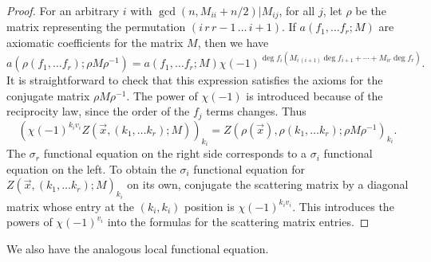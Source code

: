 \documentclass[11pt,letterpaper]{article}
\theoremstyle{definition}
\theoremstyle{remark}
\numberwithin{equation}{section}
\theoremstyle{dotless}
\begin{document}
\begin{proof}
For an arbitrary $i$ with $\gcd(n, M_{ii}+n/2) | M_{ij}$, for all $j$, let $\rho$ be the matrix representing the permutation $(i \, r \, r-1 \, \ldots \, i+1)$. If $a(f_1, \ldots f_r; M)$ are axiomatic coefficients for the matrix $M$, then we have
\begin{equation*} 
a(\rho(f_1, \ldots f_r); \rho M \rho^{-1}) = a(f_1, \ldots f_r; M) \chi(-1)^{\deg f_i (M_{i \, (i+1)} \deg f_{i+1} + \cdots + M_{ir}\deg f_r)}.
\end{equation*}
It is straightforward to check that this expression satisfies the axioms for the conjugate matrix $\rho M \rho^{-1}$. The power of $\chi(-1)$ is introduced because of the reciprocity law, since the order of the $f_j$ terms changes. Thus 
\begin{equation*}
(\chi(-1)^{k_i v_i} Z(\vec{x}, (k_1, \ldots k_r); M))_{k_i} = Z(\rho(\vec{x}), \rho(k_1, \ldots k_r); \rho M \rho^{-1})_{k_i}.
\end{equation*}
The $\sigma_r$ functional equation on the right side corresponds to a $\sigma_i$ functional equation on the left. To obtain the $\sigma_i$ functional equation for $Z(\vec{x}, (k_1, \ldots k_r); M)_{k_i}$ on its own, conjugate the scattering matrix by a diagonal matrix whose entry at the $(k_i, k_i)$ position is $\chi(-1)^{k_i v_i}$. This introduces the powers of $\chi(-1)^{v_i}$ into the formulas for the scattering matrix entries.
\end{proof}


We also have the analogous local functional equation.
\end{document}
